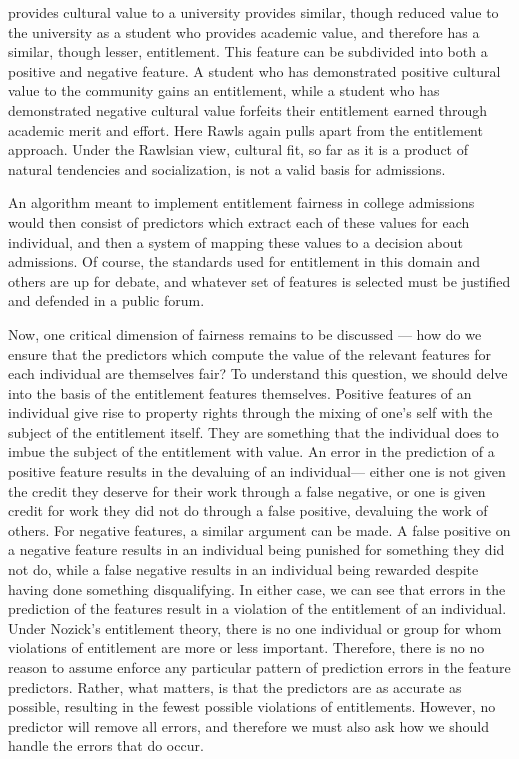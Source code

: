 \begin{itemize}
    provides cultural value to a university provides similar, though reduced
    value to the university as a student who provides academic value, and
    therefore has a similar, though lesser, entitlement. This feature can be
    subdivided into both a positive and negative feature. A student who has 
    demonstrated positive cultural value to the community gains an entitlement,
    while a student who has demonstrated negative cultural value forfeits their
    entitlement earned through academic merit and effort. Here Rawls again pulls
    apart from the entitlement approach. Under the Rawlsian view, cultural fit,
    so far as it is a product of natural tendencies and socialization, is not a
    valid basis for admissions.
\end{itemize}
An algorithm meant to implement entitlement fairness in college admissions
would then consist of predictors which extract each of these values for each
individual, and then a system of mapping these values to a decision about
admissions. Of course, the standards used for entitlement in this domain and
others are up for debate, and whatever set of features is selected must be
justified and defended in a public forum.

Now, one critical dimension of fairness remains to be discussed — how do we
ensure that the predictors which compute the value of the relevant features for
each individual are themselves fair? To understand this question, we should
delve into the basis of the entitlement features themselves. Positive features
of an individual give rise to property rights through the mixing of one's self 
with the subject of the entitlement itself. They are something that the
individual does to imbue the subject of the entitlement with value. An error in
the prediction of a positive feature results in the devaluing of an individual—
either one is not given the credit they deserve for their work through a false
negative, or one is given credit for work they did not do through a false
positive, devaluing the work of others. For negative features, a similar 
argument can be made. A false positive on a negative feature results in an
individual being punished for something they did not do, while a false
negative results in an individual being rewarded despite having done something
disqualifying. In either case, we can see that errors in the prediction of 
the features result in a violation of the entitlement of an individual. Under 
Nozick's entitlement theory, there is no one individual or group for whom 
violations of entitlement are more or less important. Therefore, there is no
no reason to assume enforce any particular pattern of prediction errors in the
feature predictors. Rather, what matters, is that the predictors are as accurate
as possible, resulting in the fewest possible violations of entitlements.
However, no predictor will remove all errors, and therefore we must also ask how
we should handle the errors that do occur.

